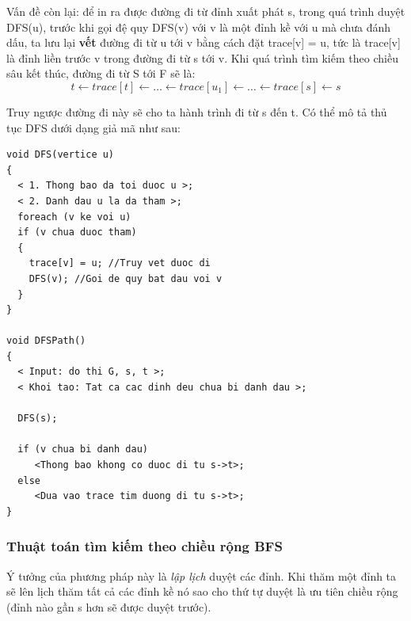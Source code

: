 \documentclass[a4paper,10pt]{article}
\begin{document}
Vấn đề còn lại: để in ra được đường đi từ đỉnh xuất phát s, trong quá trình duyệt DFS(u), trước khi gọi đệ quy DFS(v) với v là một đỉnh kề với u mà chưa đánh dấu, ta lưu lại \textbf{vết} đường đi từ u tới v bằng cách đặt \textsf{trace[v] = u}, tức là \textsf{trace[v]} là đỉnh liền trước v trong đường đi từ s tới v. Khi quá trình tìm kiếm theo chiều sâu kết thúc, đường đi từ S tới F sẽ là:
$$t \leftarrow trace[t] \leftarrow \ldots \leftarrow trace[u_1] \leftarrow \ldots \leftarrow trace[s] \leftarrow s$$

Truy ngược đường đi này sẽ cho ta hành trình đi từ s đến t. Có thể mô tả thủ tục DFS dưới dạng giả mã như sau:


\begin{verbatim}
void DFS(vertice u)
{
  < 1. Thong bao da toi duoc u >;
  < 2. Danh dau u la da tham >;
  foreach (v ke voi u)
  if (v chua duoc tham)
  {
    trace[v] = u; //Truy vet duoc di
    DFS(v); //Goi de quy bat dau voi v
  }
}

void DFSPath()
{
  < Input: do thi G, s, t >;
  < Khoi tao: Tat ca cac dinh deu chua bi danh dau >;

  DFS(s);

  if (v chua bi danh dau)
     <Thong bao khong co duoc di tu s->t>;
  else
     <Dua vao trace tim duong di tu s->t>;
}
\end{verbatim}

\subsubsection{Thuật toán tìm kiếm theo chiều rộng BFS}
Ý tưởng của phương pháp này là \emph{lập lịch} duyệt các đỉnh. Khi thăm một đỉnh ta sẽ lên lịch thăm tất cả các đỉnh kề nó sao cho thứ tự duyệt là ưu tiên chiều rộng (đỉnh nào gần s hơn sẽ được duyệt trước).
\end{document}
